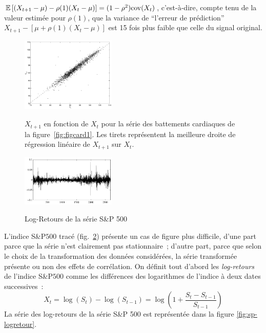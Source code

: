  ${\mathbb E}\left[ (X_{t+1}-\mu)-\rho(1)(X_t-\mu) \right] = (1-\rho^2) \mathrm{cov}(X_t)$, c'est-\`a-dire,
 compte tenu de la valeur estim\'ee pour $\rho(1)$, que la variance de ``l'erreur
 de pr\'ediction'' $X_{t+1}-[\mu+\rho(1)(X_t-\mu)]$ est 15 fois plus faible que
 celle du signal original.
\begin{figure}
  \centering
  \includegraphics[width=0.4\textwidth]{Figures/cov_hr11839}\\
  \caption{$X_{t+1}$ en fonction de $X_t$ pour la s\'erie
 des battements cardiaques de la figure~\ref{fig:figcard1}. Les tirets
 repr\'esentent la meilleure droite de r\'egression lin\'eaire de $X_{t+1}$ sur $X_t$.}
 \label{fig:xcov}
\end{figure}

\begin{figure}
  \centering
  \includegraphics[width=0.4\textwidth]{Figures/logretourSP}\\
  \caption{Log-Retours de la s\'erie S\&P 500}\label{fig:SP}
\end{figure}
 L'indice S\&P$500$ trac\'e (fig.~\ref{fig:SP}) pr\'esente un cas de figure plus
 difficile, d'une part parce que la s\'erie n'est clairement pas
 stationnaire~; d'autre part, parce que selon le choix de la transformation des
 donn\'ees consid\'er\'ees, la s\'erie transform\'ee pr\'esente ou non des effets de
 corr\'elation. On d\'efinit tout d'abord les \emph{log-retours} de l'indice
 S\&P$500$ comme les diff\'erences des logarithmes de l'indice \`a deux dates
 successives~:
\[
 X_{t} = \log( S_{t}) - \log(S_{t-1})
      = \log \left( 1 + \frac{S_{t}-S_{t-1}}{S_{t-1}} \right)
\]
La s\'erie des log-retours de la s\'erie S\&P 500 est repr\'esent\'ee dans la
figure \ref{fig:sp-logretour}.

